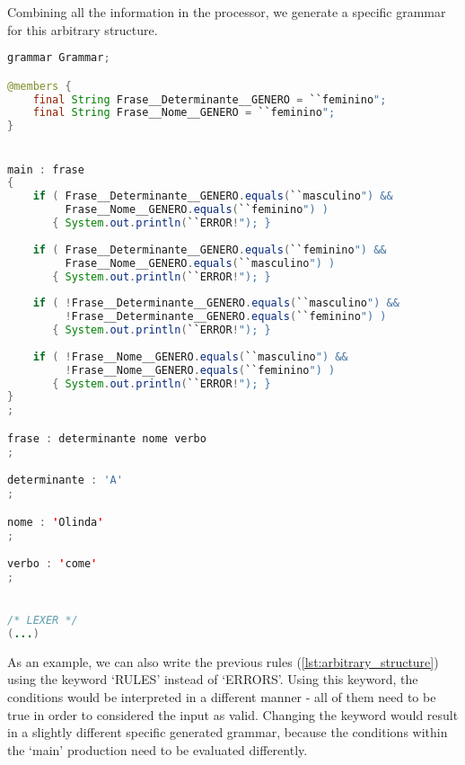 Combining all the information in the processor, we generate a specific grammar for this arbitrary structure.

\begin{center}
\begin{minipage}{10cm}
\begin{lstlisting}[language=java, basicstyle=\tiny, label={lst:case_study_sentence}, caption=Example of a specific generated grammar.]
grammar Grammar;

@members {
    final String Frase__Determinante__GENERO = ``feminino";
    final String Frase__Nome__GENERO = ``feminino";
}


main : frase
{
    if ( Frase__Determinante__GENERO.equals(``masculino") &&
         Frase__Nome__GENERO.equals(``feminino") ) 
       { System.out.println(``ERROR!"); }
	
    if ( Frase__Determinante__GENERO.equals(``feminino") &&
         Frase__Nome__GENERO.equals(``masculino") ) 
       { System.out.println(``ERROR!"); }
	
    if ( !Frase__Determinante__GENERO.equals(``masculino") &&
         !Frase__Determinante__GENERO.equals(``feminino") ) 
       { System.out.println(``ERROR!"); }
	
    if ( !Frase__Nome__GENERO.equals(``masculino") &&
         !Frase__Nome__GENERO.equals(``feminino") )
       { System.out.println(``ERROR!"); }
}
;

frase : determinante nome verbo 
;

determinante : 'A'
;

nome : 'Olinda'
;

verbo : 'come'
;


/* LEXER */
(...)
\end{lstlisting}
\end{minipage}
\end{center}

As an example, we can also write the previous rules (\autoref{lst:arbitrary_structure}) using the keyword `RULES' instead of `ERRORS'.
Using this keyword, the conditions would be interpreted in a different manner - all of them need to be true in order to considered the input as valid.
Changing the keyword would result in a slightly different specific generated grammar, because the conditions within the ‘main’ production need to be evaluated differently.

